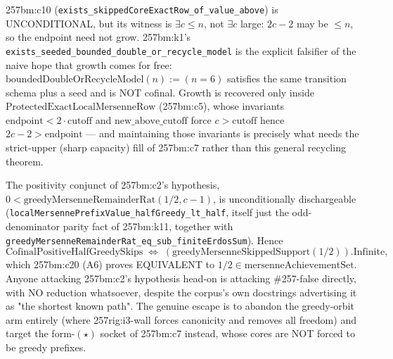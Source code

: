 \begin{thm}
257bm:c10 (\texttt{exists\_skippedCoreExactRow\_of\_value\_above}) is UNCONDITIONAL, but its
witness is $\exists c\le n$, not $\exists c$ large: $2c-2$ may be $\le n$, so the endpoint need
not grow. 257bm:k1's \texttt{exists\_seeded\_bounded\_double\_or\_recycle\_model} is the
explicit falsifier of the naive hope that growth comes for free:
$\mathrm{boundedDoubleOrRecycleModel}(n):=(n=6)$ satisfies the same transition schema plus a
seed and is NOT cofinal. Growth is recovered only inside
$\mathrm{ProtectedExactLocalMersenneRow}$ (257bm:c5), whose invariants
$\mathrm{endpoint}<2\cdot\mathrm{cutoff}$ and $\mathrm{new\_above\_cutoff}$ force $c>\mathrm{cutoff}$
hence $2c-2>\mathrm{endpoint}$ — and maintaining those invariants is precisely what needs the
strict-upper (sharp capacity) fill of 257bm:c7 rather than this general recycling theorem.
\par\noindent{}   
\end{thm}

\begin{obs}
The positivity conjunct of 257bm:c2's hypothesis,
$0<\mathrm{greedyMersenneRemainderRat}(1/2,c{-}1)$, is unconditionally dischargeable
(\texttt{localMersennePrefixValue\_halfGreedy\_lt\_half}, itself just the odd-denominator parity
fact of 257bm:k11, together with \texttt{greedyMersenneRemainderRat\_eq\_sub\_finiteErdosSum}). Hence
\[
\mathrm{CofinalPositiveHalfGreedySkips} \;\Longleftrightarrow\; (\mathrm{greedyMersenneSkippedSupport}(1/2)).\mathrm{Infinite},
\]
which 257bm:c20 (A6) proves EQUIVALENT to $1/2\in\mathrm{mersenneAchievementSet}$. Anyone
attacking 257bm:c2's hypothesis head-on is attacking \#257-false directly, with NO reduction
whatsoever, despite the corpus's own docstrings advertising it as "the shortest known path". The
genuine escape is to abandon the greedy-orbit arm entirely (where 257rig:i3-wall forces
canonicity and removes all freedom) and target the form-$(\star)$ socket of 257bm:c7 instead, whose
cores are NOT forced to be greedy prefixes.
\par\noindent{}   
\end{obs}

